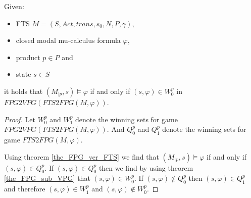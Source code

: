 \begin{theorem}
	\label{the_VPG_ver_FTS}
	Given:
	\begin{itemize}
		\item FTS $M = (S, Act, trans, s_0, N, P, \gamma)$,
		\item closed modal mu-calculus formula $\varphi$,
		\item product $p \in P$ and
		\item state $s \in S$
	\end{itemize}
	it holds that $(M_{|p}, s) \models \varphi$ if and only if $(s, \varphi) \in W_0^{p}$ in $\textit{FPG2VPG}(\textit{FTS2FPG}(M, \varphi))$.
	\begin{proof}
		Let $W_0^{p}$ and $W_1^{p}$ denote the winning sets for game $\textit{FPG2VPG}(\textit{FTS2FPG}(M, \varphi))$. And $Q_0^{p}$ and $Q_1^{p}$ denote the winning sets for game $\textit{FTS2FPG}(M, \varphi)$.
		
		Using theorem \ref{the_FPG_ver_FTS} we find that $(M_{|p}, s) \models \varphi$ if and only if $(s, \varphi) \in Q_0^{p}$. If $(s, \varphi) \in Q_0^{p}$ then we find by using theorem \ref{the_FPG_sub_VPG} that $(s, \varphi) \in W_0^{p}$. If $(s, \varphi) \not\in Q_0^{p}$ then $(s, \varphi) \in Q_1^{p}$ and therefore $(s, \varphi) \in W_1^{p}$ and $(s, \varphi) \not\in W_0^{p}$.
	\end{proof}
\end{theorem}


